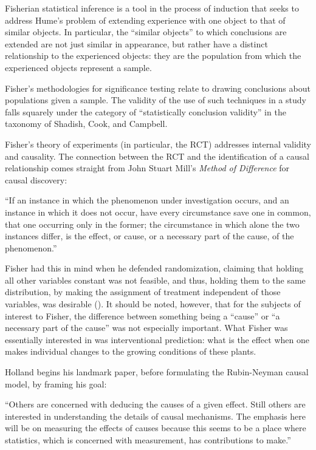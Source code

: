 \documentclass[a4paper,12pt]{article}
\begin{document}
Fisherian statistical inference is a tool in the process of induction that seeks to address Hume's problem of extending experience with one object to that of similar objects. In particular, the ``similar objects'' to which conclusions are extended are not just similar in appearance, but rather have a distinct relationship to the experienced objects: they are the population from which the experienced objects represent a sample.

Fisher's methodologies for significance testing relate to drawing conclusions about populations given a sample. The validity of the use of such techniques in a study falls squarely under the category of ``statistically conclusion validity'' in the taxonomy of Shadish, Cook, and Campbell.

Fisher's theory of experiments (in particular, the RCT) addresses internal validity and causality. The connection between the RCT and the identification of a causal relationship comes straight from John Stuart Mill's \parencite*{mill1884} \textit{Method of Difference} for causal discovery:
 
\begin{displayquote}
  ``If an instance in which the phenomenon under investigation occurs, and an instance in which it does not occur, have every circumstance save one in common, that one occurring only in the former; the circumstance in which alone the two instances differ, is the effect, or cause, or a necessary part of the cause, of the phenomenon.''
\end{displayquote}

Fisher \parencite*{Fisher1935} had this in mind when he defended randomization, claiming that holding all other variables constant was not feasible, and thus, holding them to the same distribution, by making the assignment of treatment independent of those variables, was desirable (\cite{Rosenbaum2005}). It should be noted, however, that for the subjects of interest to Fisher, the difference between something being a ``cause'' or ``a necessary part of the cause'' was not especially important. What Fisher was essentially interested in was interventional prediction: what is the effect when one makes individual changes to the growing conditions of these plants.

Holland \parencite*{Holland1986} begins his landmark paper, before formulating the Rubin-Neyman causal model, by framing his goal:

\begin{displayquote}
``Others are concerned with deducing the causes of a given effect. Still others are interested in understanding the details of causal mechanisms. The emphasis here will be on measuring the effects of causes because this seems to be a place where statistics, which is concerned with measurement, has contributions to make.''
\end{displayquote}
\end{document}
